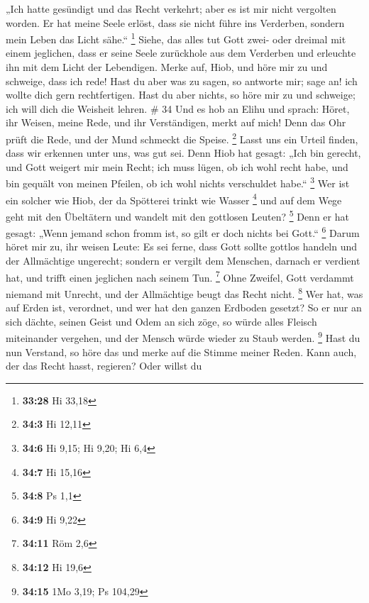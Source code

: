 „Ich hatte gesündigt und das Recht verkehrt; aber es ist mir nicht
vergolten worden.  Er hat meine Seele erlöst, dass sie
nicht führe ins Verderben, sondern mein Leben das Licht sähe.``
\footnote{\textbf{33:28} Hi 33,18}  Siehe, das alles tut
Gott zwei- oder dreimal mit einem jeglichen,  dass er
seine Seele zurückhole aus dem Verderben und erleuchte ihn mit dem Licht
der Lebendigen.  Merke auf, Hiob, und höre mir zu und
schweige, dass ich rede!  Hast du aber was zu sagen, so
antworte mir; sage an! ich wollte dich gern rechtfertigen.
 Hast du aber nichts, so höre mir zu und schweige; ich
will dich die Weisheit lehren. \# 34  Und es hob an Elihu
und sprach:  Höret, ihr Weisen, meine Rede, und ihr
Verständigen, merkt auf mich!  Denn das Ohr prüft die
Rede, und der Mund schmeckt die Speise. \footnote{\textbf{34:3} Hi 12,11}
 Lasst uns ein Urteil finden, dass wir erkennen unter uns,
was gut sei.  Denn Hiob hat gesagt: „Ich bin gerecht, und
Gott weigert mir mein Recht;  ich muss lügen, ob ich wohl
recht habe, und bin gequält von meinen Pfeilen, ob ich wohl nichts
verschuldet habe.`` \footnote{\textbf{34:6} Hi 9,15; Hi 9,20; Hi 6,4}
 Wer ist ein solcher wie Hiob, der da Spötterei trinkt wie
Wasser \footnote{\textbf{34:7} Hi 15,16}  und auf dem Wege
geht mit den Übeltätern und wandelt mit den gottlosen Leuten?
\footnote{\textbf{34:8} Ps 1,1}  Denn er hat gesagt: „Wenn
jemand schon fromm ist, so gilt er doch nichts bei Gott.`` \footnote{\textbf{34:9}
  Hi 9,22}  Darum höret mir zu, ihr weisen Leute: Es sei
ferne, dass Gott sollte gottlos handeln und der Allmächtige ungerecht;
 sondern er vergilt dem Menschen, darnach er verdient
hat, und trifft einen jeglichen nach seinem Tun. \footnote{\textbf{34:11}
  Röm 2,6}  Ohne Zweifel, Gott verdammt niemand mit
Unrecht, und der Allmächtige beugt das Recht nicht. \footnote{\textbf{34:12}
  Hi 19,6}  Wer hat, was auf Erden ist, verordnet, und
wer hat den ganzen Erdboden gesetzt?  So er nur an sich
dächte, seinen Geist und Odem an sich zöge,  so würde
alles Fleisch miteinander vergehen, und der Mensch würde wieder zu Staub
werden. \footnote{\textbf{34:15} 1Mo 3,19; Ps 104,29} 
Hast du nun Verstand, so höre das und merke auf die Stimme meiner Reden.
 Kann auch, der das Recht hasst, regieren? Oder willst du
